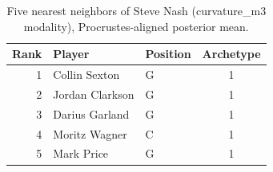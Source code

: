 \begin{table}[htbp]
  \centering\small
  \begin{tabular}{rllc}
    \toprule
    Rank & Player & Position & Archetype \\
    \midrule
    1 & Collin Sexton & G & 1 \\
    2 & Jordan Clarkson & G & 1 \\
    3 & Darius Garland & G & 1 \\
    4 & Moritz Wagner & C & 1 \\
    5 & Mark Price & G & 1 \\
    \bottomrule
  \end{tabular}
  \caption{Five nearest neighbors of Steve Nash (curvature_m3 modality), Procrustes-aligned posterior mean.}
  \label{tab:Steve_Nash_neighbors_curvature_m3}
\end{table}

